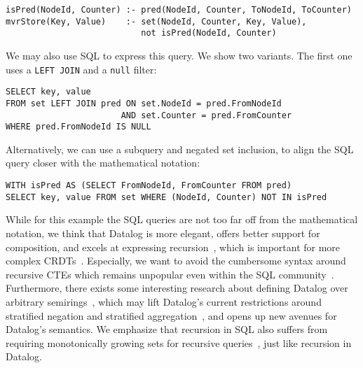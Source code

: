 \documentclass{article}
\newcommand{\code}[1]{\texttt{#1}}
\begin{document}
\begin{small}
	\begin{verbatim}
isPred(NodeId, Counter) :- pred(NodeId, Counter, ToNodeId, ToCounter)
mvrStore(Key, Value)    :- set(NodeId, Counter, Key, Value),
                           not isPred(NodeId, Counter)
\end{verbatim}
\end{small}

We may also use SQL to express this query. We show two variants.
The first one uses a \code{LEFT JOIN} and a \code{null} filter:

\begin{small}
	\begin{verbatim}
SELECT key, value
FROM set LEFT JOIN pred ON set.NodeId = pred.FromNodeId
                       AND set.Counter = pred.FromCounter
WHERE pred.FromNodeId IS NULL
\end{verbatim}
\end{small}

Alternatively, we can use a subquery and negated set inclusion,
to align the SQL query closer with the mathematical notation:

\begin{small}
	\begin{verbatim}
WITH isPred AS (SELECT FromNodeId, FromCounter FROM pred)
SELECT key, value FROM set WHERE (NodeId, Counter) NOT IN isPred
\end{verbatim}
\end{small}

While for this example the SQL queries are not too far off from the mathematical
notation, we think that Datalog is more elegant, offers better support for
composition, and excels at expressing recursion~\cite{abo2024convergence},
which is important for more complex CRDTs~\cite{kleppmann2018data}.
Especially, we want to avoid the cumbersome syntax around recursive
CTEs which remains unpopular even within the SQL
community~\cite{neumann2024critique, hirn2023fix, mcsherry2022recursion}.
Furthermore, there exists some interesting research about defining Datalog
over arbitrary semirings~\cite{abo2024convergence, khamis2022datalog},
which may lift Datalog's current restrictions around stratified negation and
stratified aggregation~\cite{green2013datalog}, and opens up new avenues for
Datalog's semantics.
We emphasize that recursion in SQL also suffers from requiring
monotonically growing sets for recursive queries~\cite{hirn2023fix},
just like recursion in Datalog.
\end{document}
